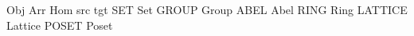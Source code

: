 
\let\thecat=\namedcat                  %
\def\somecat#1{{\bbb #1}}              %
\let\cat=\somecat                      %
\def\catby#1{\cat C[#1]}               %
\def\numcat#1{{\bbold #1}}             %
\def\one{{\mathit 1}}                  %
\def\oneof#1{{\one_{#1}}}              %
\def\arrset#1#2#3{{#1}(#2,#3)}         %
\def\homset#1#2{\Hom(#1,#2)}           %
\def\homsetin#1#2#3{\Hom_{#1}(#2,#3)}  %
\def\prosetal#1#2{#1_{#2}}             %
\def\theprosetalcat#1#2{\prosetal{\thecat{#1}}{(#2)}} %
\DefOpP Obj
\DefOpP Arr
\DefOp  Hom
\DefOp  src
\DefOp  tgt
\def\SETSUB  {\theprosetalcat {Set} \subset}
\def\INTLEQ  {\theprosetalcat {Int} \leq}
\def\INTDIV  {\theprosetalcat {Int} \divides}
\def\PSET    {\thecat{Set}_{{\star}}}
\def\ZERO    {\numcat{0}}
\def\ONE     {\numcat{1}}
\def\TWO     {\numcat{2}}
\DefCAT SET         Set
\DefCAT GROUP       Group
\DefCAT ABEL        Abel
\DefCAT RING        Ring
\DefCAT LATTICE     Lattice
\DefCAT POSET       Poset

